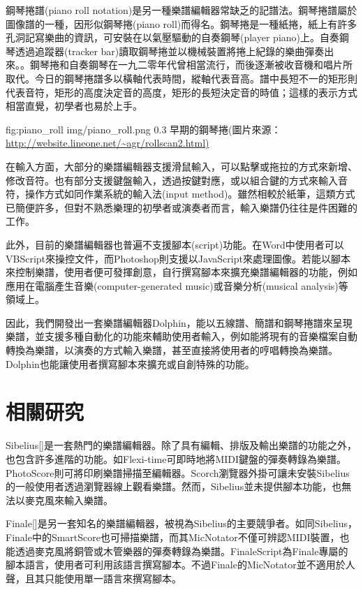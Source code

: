 \documentclass[12pt,a4paper,oneside]{report}
\begin{document}
鋼琴捲譜(piano roll notation)是另一種樂譜編輯器常缺乏的記譜法。鋼琴捲譜屬於圖像譜的一種，因形似鋼琴捲(piano roll)而得名。鋼琴捲是一種紙捲，紙上有許多孔洞記寫樂曲的資訊，可安裝在以氣壓驅動的自奏鋼琴(player piano)上。自奏鋼琴透過追蹤器(tracker bar)讀取鋼琴捲並以機械裝置將捲上紀錄的樂曲彈奏出來。。鋼琴捲和自奏鋼琴在一九二零年代曾相當流行，而後逐漸被收音機和唱片所取代\cite{thePiano}。今日的鋼琴捲譜多以橫軸代表時間，縱軸代表音高。譜中長短不一的矩形則代表音符，矩形的高度決定音的高度，矩形的長短決定音的時值；這樣的表示方式相當直覺，初學者也易於上手。

\figurewithcaption
{fig:piano_roll}
{img/piano_roll.png}
{0.3}
{早期的鋼琴捲(圖片來源：\url{http://website.lineone.net/~agr/rollscan2.html)}}

在輸入方面，大部分的樂譜編輯器支援滑鼠輸入，可以點擊或拖拉的方式來新增、修改音符。也有部分支援鍵盤輸入，透過按鍵對應，或以組合鍵的方式來輸入音符，操作方式如同作業系統的輸入法(input method)。雖然相較於紙筆，這類方式已簡便許多，但對不熟悉樂理的初學者或演奏者而言，輸入樂譜仍往往是件困難的工作。

此外，目前的樂譜編輯器也普遍不支援腳本(script)功能。在Word中使用者可以VBScript來操控文件，而Photoshop則支援以JavaScript來處理圖像。若能以腳本來控制樂譜，使用者便可發揮創意，自行撰寫腳本來擴充樂譜編輯器的功能，例如應用在電腦產生音樂(computer-generated music)或音樂分析(musical analysis)等領域上。

因此，我們開發出一套樂譜編輯器Dolphin，能以五線譜、簡譜和鋼琴捲譜來呈現樂譜，並支援多種自動化的功能來輔助使用者輸入，例如能將現有的音樂檔案自動轉換為樂譜，以演奏的方式輸入樂譜，甚至直接將使用者的哼唱轉換為樂譜。Dolphin也能讓使用者撰寫腳本來擴充或自創特殊的功能。

\section{相關研究}

Sibelius[]是一套熱門的樂譜編輯器。除了具有編輯、排版及輸出樂譜的功能之外，也包含許多進階的功能。如Flexi-time可即時地將MIDI鍵盤的彈奏轉錄為樂譜。PhotoScore則可將印刷樂譜掃描至編輯器。Scorch瀏覽器外掛可讓未安裝Sibelius的一般使用者透過瀏覽器線上觀看樂譜。然而，Sibelius並未提供腳本功能，也無法以麥克風來輸入樂譜。

Finale[]是另一套知名的樂譜編輯器，被視為Sibelius的主要競爭者。如同Sibelius，Finale中的SmartScore也可掃描樂譜，而其MicNotator不僅可辨認MIDI裝置，也能透過麥克風將銅管或木管樂器的彈奏轉錄為樂譜。FinaleScript為Finale專屬的腳本語言，使用者可利用該語言撰寫腳本。不過Finale的MicNotator並不適用於人聲，且其只能使用單一語言來撰寫腳本。
\end{document}
